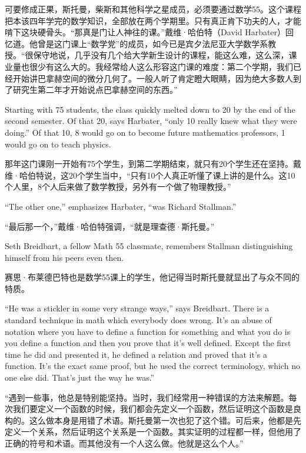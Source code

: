 \ifdefined\chs
可要修成正果，斯托曼，柴斯和其他科学之星成员，必须要通过数学55。这个课程把本该四年学完的数学知识，全部放在两个学期里。只有真正肯下功夫的人，才能啃下这块硬骨头。``那真是门让人神往的课。''戴维·哈伯特（David Harbater）回忆道。他曾是这门课上``数学党''的成员，如今已是宾夕法尼亚大学数学系教授。``很保守地说，几乎没有几个给大学新生设计的课程，能这么难，这么深，课业量也很少有这么大的。我经常给人这么形容这门课的难度：第二个学期，我们已经开始讲巴拿赫空间的微分几何了。一般人听了肯定瞪大眼睛，因为绝大多数人到了研究生第二年才开始说点巴拿赫空间的东西。''
\fi

\ifdefined\eng
Starting with 75 students, the class quickly melted down to 20 by the end of the second semester. Of that 20, says Harbater, ``only 10 really knew what they were doing.'' Of that 10, 8 would go on to become future mathematics professors, 1 would go on to teach physics.
\fi

\ifdefined\chs
那年这门课刚一开始有75个学生，到第二学期结束，就只有20个学生还在坚持。戴维·哈伯特说，这20个学生当中，``只有10个人真正听懂了课上讲的是什么。这10个人里，8个人后来做了数学教授，另外有一个做了物理教授。''
\fi

\ifdefined\eng
``The other one,'' emphasizes Harbater, ``was Richard Stallman.''
\fi

\ifdefined\chs
``最后那一个，''戴维·哈伯特强调，``就是理查德·斯托曼。''
\fi

\ifdefined\eng
Seth Breidbart, a fellow Math 55 classmate, remembers Stallman distinguishing himself from his peers even then.
\fi

\ifdefined\chs
赛思·布莱德巴特也是数学55课上的学生，他记得当时斯托曼就显出了与众不同的特质。
\fi

\ifdefined\eng
``He was a stickler in some very strange ways,'' says Breidbart. There is a standard technique in math which everybody does wrong. It's an abuse of notation where you have to define a function for something and what you do is you define a function and then you prove that it's well defined. Except the first time he did and presented it, he defined a relation and proved that it's a function. It's the exact same proof, but he used the correct terminology, which no one else did. That's just the way he was.''
\fi

\ifdefined\chs
``遇到一些事，他总是特别能坚持。当时，我们经常用一种错误的方法来解题。每次我们要定义一个函数的时候，我们都会先定义一个函数，然后证明这个函数是良构的。这么做本身是用错了术语。斯托曼第一次也犯了这个错。可后来，他都是先定义一个关系，然后证明这个关系是一个函数。其实证明的过程都一样，但他用了正确的符号和术语。而其他没有一个人这么做。他就是这么个人。''
\fi

